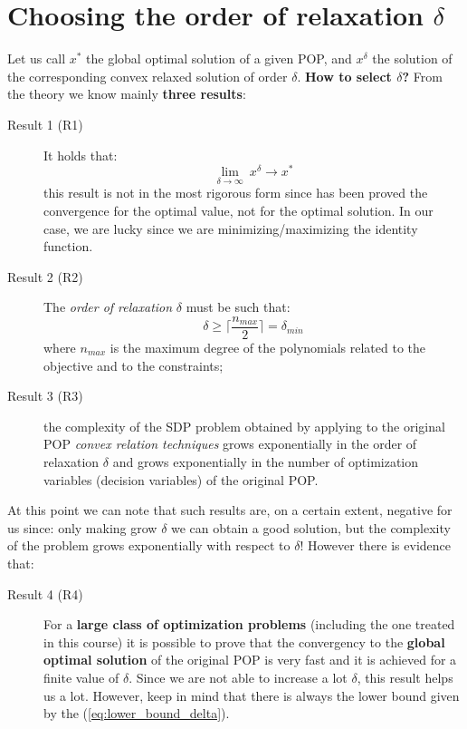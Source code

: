 \section{Choosing the order of relaxation $\delta$}
Let us call $x^*$ the global optimal solution of a given POP, and $x^{\delta}$ the solution of the corresponding convex relaxed solution of order $\delta$. \textbf{How to select $\delta$?} From the theory we know mainly \textbf{three results}:
\begin{description}
    \item[\color{blue}Result 1 \textsf{(R1)}] It holds that:
    \begin{equation}
            \lim_{\delta\to\infty} \  x^\delta \to x^*
    \end{equation}
    this result is not in the most rigorous form since has been proved the convergence for the optimal value, not for the optimal solution. In our case, we are lucky since we are minimizing/maximizing the identity function.
    \item[\color{blue}Result 2 \textsf{(R2)}] The \textit{order of relaxation} $\delta$ must be such that:
    \begin{equation}\label{eq:lower_bound_delta}
        \delta \ge \bigg\lceil \frac{n_{max}}{2}\bigg\rceil =\delta_{min}
    \end{equation} 
    where $n_{max}$ is the maximum degree of the polynomials related to the objective and to the constraints; 
    \item[\color{blue}Result 3 \textsf{(R3)}] the complexity of the SDP problem obtained by applying to the original POP \textit{convex relation techniques} grows exponentially in the order of relaxation $\delta$ and grows exponentially in the number of optimization variables (decision variables) of the original POP. 
\end{description}

\noindent
At this point we can note that such results are, on a certain extent, negative for us since: only making grow $\delta$ we can obtain a good solution, but the complexity of the problem grows exponentially with respect to $\delta$!  
However there is evidence that:\\
\begin{description}
    \item[\color{blue}Result 4 \textsf{(R4)}] For a \textbf{large class of optimization problems} (including the one treated in this course) it is possible to prove that the convergency to the \textbf{global optimal solution} of the original POP is very fast and it is achieved for a finite value of $\delta$. Since we are not able to increase a lot $\delta$, this result helps us a lot. However, keep in mind that there is always the lower bound given by the (\ref{eq:lower_bound_delta}).
\end{description}

